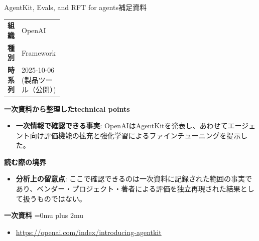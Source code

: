 \begin{technicalnote}{AgentKit, Evals, and RFT for agents}{補足資料}
\begingroup
\begin{tabularx}{\linewidth}{@{}>{\bfseries}p{0.22\linewidth}X@{}}
組織 & OpenAI \\
種別 & Framework \\
時系列 & 2025-10-06 (製品ツール（公開）) \\
\end{tabularx}
\smallskip
{\bfseries 一次資料から整理したtechnical points}
\begin{itemize}[leftmargin=1.5em,itemsep=0.35em]
\item \textbf{一次情報で確認できる事実}: OpenAIはAgentKitを発表し、あわせてエージェント向け評価機能の拡充と強化学習によるファインチューニングを提示した。
\end{itemize}
\begin{minipage}{\linewidth}
{\bfseries 読む際の境界}
\begin{itemize}[leftmargin=1.5em,itemsep=0.35em]
\item \textbf{分析上の留意点}: ここで確認できるのは一次資料に記録された範囲の事実であり、ベンダー・プロジェクト・著者による評価を独立再現された結果として扱うものではない。
\end{itemize}
\begin{samepage}
{\bfseries 一次資料}
\begingroup\sloppy
\Urlmuskip=0mu plus 2mu\relax
\begin{itemize}[leftmargin=1.5em,itemsep=0.25em]
\item {\scriptsize\url{https://openai.com/index/introducing-agentkit}}
\end{itemize}
\endgroup
\end{samepage}
\end{minipage}
\endgroup
\end{technicalnote}
\medskip

